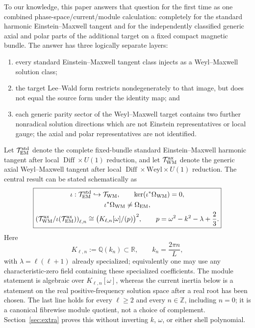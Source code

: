\documentclass[11pt]{article}
\theoremstyle{remark}
\newcommand{\cT}{\mathcal T}
\newcommand{\Diff}{\operatorname{Diff}}
\begin{document}
To our knowledge, this paper answers that question for the first time as one
combined phase-space/current/module calculation: completely for the standard harmonic
Einstein--Maxwell tangent and for the independently classified generic axial
and polar parts of the additional target on a fixed compact magnetic bundle.
The answer has three logically
separate layers:
\begin{enumerate}
\item every standard Einstein--Maxwell tangent class injects as a
Weyl--Maxwell solution class;
\item the target Lee--Wald form restricts nondegenerately to that image, but
does not equal the source form under the identity map; and
\item each generic parity sector of the Weyl--Maxwell target contains two
further nonradical solution directions which are not Einstein representatives
or local gauge; the axial and polar representatives are not identified.
\end{enumerate}

Let $\cT_{\rm EM}^{\rm std}$ denote the complete fixed-bundle standard
Einstein--Maxwell harmonic tangent after local $\Diff\times U(1)$ reduction,
and let $\cT_{\rm WM}^{\rm ax}$ denote the generic axial Weyl--Maxwell tangent
after local $\Diff\times\text{Weyl}\times U(1)$ reduction. The central result
can be stated schematically as
\begin{equation}\label{eq:central-summary}
 \boxed{\begin{gathered}
 \iota:\cT_{\rm EM}^{\rm std}\hookrightarrow\cT_{\rm WM},
 \qquad \ker(\iota^*\Omega_{\rm WM})=0,\\
 \iota^*\Omega_{\rm WM}\neq\Omega_{\rm EM},\\
 \left(\cT_{\rm WM}^{\rm ax}/\iota(\cT_{\rm EM}^{\rm ax})\right)_{\ell,n}
 \cong \bigl(K_{\ell,n}[\omega]/(p)\bigr)^2,
 \qquad p=\omega^2-k^2-\lambda+\frac23 .
 \end{gathered}}
\end{equation}
Here
\begin{equation}
 K_{\ell,n}:=\mathbb Q(k_n)\subset\mathbb R,
 \qquad k_n=\frac{2\pi n}{L},
\end{equation}
with $\lambda=\ell(\ell+1)$ already specialized; equivalently one may use
any characteristic-zero field containing these specialized coefficients.
The module statement is algebraic over $K_{\ell,n}[\omega]$, whereas the
current inertia below is a statement on the real positive-frequency solution
space after a real root has been chosen. The last line holds for every
$\ell\geq2$ and every
$n\in\mathbb Z$, including $n=0$; it is a canonical fibrewise module
quotient, not a choice of complement. Section~\ref{sec:extra} proves this
without inverting $k$, $\omega$, or either shell polynomial.
\end{document}
